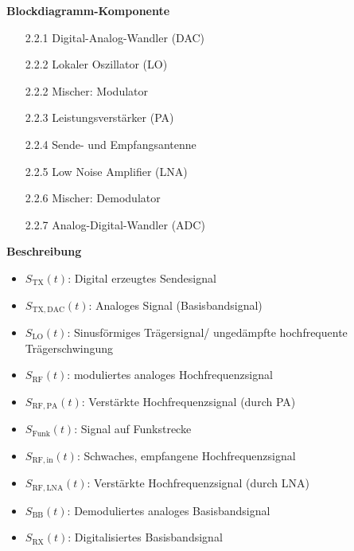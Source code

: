 \begin{minipage}[t]{0.48\textwidth}
    \raggedright
    \textbf{\large Blockdiagramm-Komponente}\\[2ex]
    \begin{enumerate}
        \item [2.2.1] Digital-Analog-Wandler (DAC)
        \item [2.2.2] Lokaler Oszillator (LO)
        \item [2.2.2] Mischer: Modulator
        \item [2.2.3] Leistungsverstärker (PA)
        \item [2.2.4] Sende- und Empfangsantenne
        \item [2.2.5] Low Noise Amplifier (LNA)
        \item [2.2.6] Mischer: Demodulator
        \item [2.2.7] Analog-Digital-Wandler (ADC)
        
    \end{enumerate}
\end{minipage}%
\hfill
\begin{minipage}[t]{0.48\textwidth}
    \raggedright
    \textbf{\large Beschreibung}\\[2ex]
    \begin{itemize}
        \item $S_{\mathrm{TX}}(t)$: Digital erzeugtes Sendesignal
        \item $S_{\mathrm{TX,DAC}}(t)$: Analoges Signal (Basisbandsignal)
        \item $S_{\mathrm{LO}}(t)$: Sinusförmiges Trägersignal/ ungedämpfte hochfrequente Trägerschwingung
        \item $S_{\mathrm{RF}}(t)$: moduliertes analoges Hochfrequenzsignal
        \item $S_{\mathrm{RF,PA}}(t)$: Verstärkte Hochfrequenzsignal (durch PA)
        \item $S_{\mathrm{Funk}}(t)$: Signal auf Funkstrecke
        \item $S_{\mathrm{RF,in}}(t)$: Schwaches, empfangene Hochfrequenzsignal
        \item $S_{\mathrm{RF,LNA}}(t)$: Verstärkte Hochfrequenzsignal (durch LNA)
        \item $S_{\mathrm{BB}}(t)$: Demoduliertes analoges Basisbandsignal
        \item $S_{\mathrm{RX}}(t)$: Digitalisiertes Basisbandsignal
    \end{itemize}
\end{minipage}



